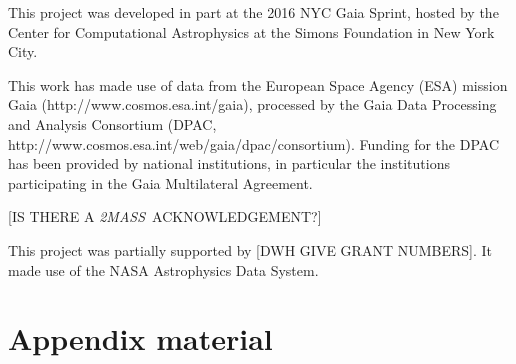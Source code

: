 \documentclass[modern]{aastex61}
\newcommand{\acronym}[1]{{\small{#1}}}
\newcommand{\project}[1]{\textsl{#1}}
\newcommand{\tmass}{\project{\acronym{2MASS}}}
\begin{document}
This project was developed in part at the 2016 \acronym{NYC} Gaia Sprint, hosted
by the Center for Computational Astrophysics at the Simons Foundation
in New York City.

This work has made use of data from the European Space Agency (\acronym{ESA})
mission Gaia (http://www.cosmos.esa.int/gaia), processed by the Gaia
Data Processing and Analysis Consortium (\acronym{DPAC},
http://www.cosmos.esa.int/web/gaia/dpac/consortium). Funding for the
\acronym{DPAC} has been provided by national institutions, in particular the
institutions participating in the Gaia Multilateral Agreement.

[IS THERE A \tmass\ ACKNOWLEDGEMENT?]

This project was partially supported by [DWH GIVE GRANT NUMBERS]. It
made use of the \acronym{NASA} Astrophysics Data System.

\appendix

\section{Appendix material}



\clearpage
\end{document}
